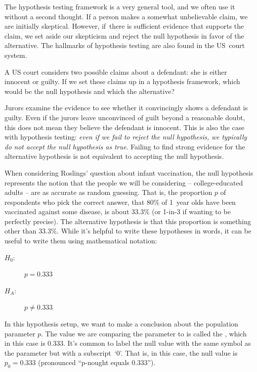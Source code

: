 The hypothesis testing framework is a very general tool, and we often use it without a second thought. If a person makes a somewhat unbelievable claim, we are initially skeptical. However, if~there is sufficient evidence that supports the claim, we set aside our skepticism and reject the null hypothesis in favor of the alternative. The hallmarks of hypothesis testing are also found in the US~court system. 

\D{\newpage}

\begin{exercisewrap}
\begin{nexercise} \label{hypTestCourtExample}
A US court considers two possible claims about a defendant: she is either innocent or guilty. If we set these claims up in a hypothesis framework, which would be the null hypothesis and which the alternative?\footnotemark
\end{nexercise}
\end{exercisewrap}

Jurors examine the evidence to see whether it convincingly
shows a defendant is guilty.
Even if the jurors leave unconvinced of guilt beyond
a reasonable doubt, this does not mean they believe the
defendant is innocent.
This is also the case with hypothesis testing:
\emph{even if we fail to reject the null hypothesis,
we typically do not accept the null hypothesis as true}.
Failing to find strong evidence for the alternative
hypothesis is not equivalent to accepting
the null hypothesis.

When considering Roslings' question about infant vaccination,
the null hypothesis represents the notion that the people
we will be considering -- college-educated adults --
are as accurate as random guessing.
That is, the proportion
$p$ of respondents who pick the correct
answer, that 80\% of 1~year olds have been vaccinated
against some disease, is about 33.3\%
(or 1-in-3 if wanting to be perfectly precise).
The alternative hypothesis is that this proportion is something
other than 33.3\%. While it's helpful to write these hypotheses
in words, it can be useful to write them using mathematical
notation:
\begin{description}
\item[$H_0$:] $p = 0.333$
\item[$H_A$:] $p \neq 0.333$
\end{description}
In this hypothesis setup, we want to make a conclusion about
the population parameter $p$. The value we are comparing the
parameter to is called the , which in this
case is 0.333. It's common to label the null value with the
same symbol as the parameter but with a subscript~`0'.
That is, in this case, the null value is $p_0 = 0.333$
(pronounced ``p-nought equals 0.333'').


